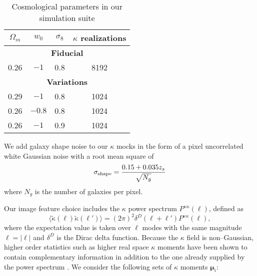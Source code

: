 \documentclass[reprint,aps,prd,superscriptaddress,showkeys,showpacs]{revtex4-1}
\begin{document}
\begin{table}
\begin{center}

\begin{tabular}{c|c|c|c}

$\Omega_m$ & $w_0$ & $\sigma_8$ & $\kappa$ realizations \\ \hline \hline
\multicolumn{4}{c}{\textbf{Fiducial}} \\ \hline
0.26 & $-1$ & 0.8 & 8192 \\ \hline

\multicolumn{4}{c}{\textbf{Variations}} \\ \hline
0.29 & $-1$ & 0.8 & 1024 \\
0.26 & $-0.8$ & 0.8 & 1024 \\
0.26 & $-1$ & 0.9 & 1024 \\ \hline

\end{tabular}

\end{center}

\caption{Cosmological parameters in our simulation suite}
\label{tab:cosmopar}

\end{table}

We add galaxy shape noise to our $\kappa$ mocks in the form of a pixel uncorrelated white Gaussian noise \citep{SongKnox} with a root mean square of
\begin{equation}
\label{par:shaperms}
\sigma_{\rm shape} = \frac{0.15+0.035z_s}{\sqrt{N_g}}
\end{equation}
%
where $N_g$ is the number of galaxies per pixel. 

Our image feature choice includes the $\kappa$ power spectrum $P^{\kappa\kappa}(\ell)$, defined as 
\begin{equation}
\label{par:powerdef}
\langle\tilde{\kappa}(\pmb{\ell})\tilde{\kappa}(\pmb{\ell}')\rangle = (2\pi)^2\delta^D(\pmb{\ell}+\pmb{\ell}')P^{\kappa\kappa}(\ell),
\end{equation}
%
where the expectation value is taken over $\pmb{\ell}$ modes with the same magnitude $\ell=\vert\pmb{\ell}\vert$ and $\delta^D$ is the Dirac delta function. Because the $\kappa$ field is non--Gaussian, higher order statistics such as higher real space $\kappa$ moments have been shown to contain complementary information in addition to the one already supplied by the power spectrum \citep{MinkPetri,CFHTMink,NG-Jain1,NG-Jain2}. We consider the following sets of $\kappa$ moments $\pmb{\mu}_i$:
\end{document}
